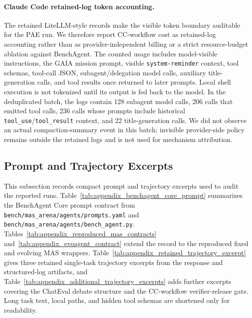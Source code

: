 \paragraph{Claude Code retained-log token accounting.}
The retained LiteLLM-style records make the visible token boundary auditable for the PAE run. We therefore report CC-workflow cost as retained-log accounting rather than as provider-independent billing or a strict resource-budget ablation against BenchAgent. The counted usage includes model-visible instructions, the GAIA mission prompt, visible \texttt{system-reminder} context, tool schemas, tool-call JSON, subagent/delegation model calls, auxiliary title-generation calls, and tool results once returned to later prompts. Local shell execution is not tokenized until its output is fed back to the model. In the deduplicated batch, the logs contain 128 subagent model calls, 206 calls that emitted tool calls, 236 calls whose prompts include historical \texttt{tool\_use}/\texttt{tool\_result} context, and 22 title-generation calls. We did not observe an actual compaction-summary event in this batch; invisible provider-side policy remains outside the retained logs and is not used for mechanism attribution.

\subsection{Prompt and Trajectory Excerpts}
\label{subsec:appendix_prompt_traj_examples}

This subsection records compact prompt and trajectory excerpts used to audit the reported runs. Table~\ref{tab:appendix_benchagent_core_prompt} summarizes the BenchAgent Core prompt contract from \texttt{bench/mas\_arena/agents/prompts.yaml} and \texttt{bench/mas\_arena/agents/bench\_agent.py}. Tables~\ref{tab:appendix_reproduced_mas_contracts} and~\ref{tab:appendix_evoagent_contract} extend the record to the reproduced fixed and evolving MAS wrappers. Table~\ref{tab:appendix_retained_trajectory_excerpt} gives three retained single-task trajectory excerpts from the response and structured-log artifacts, and Table~\ref{tab:appendix_additional_trajectory_excerpts} adds further excerpts covering the ChatEval debate structure and the CC-workflow verifier-release gate. Long task text, local paths, and hidden tool schemas are shortened only for readability.

